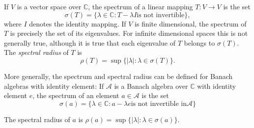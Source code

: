 \documentclass[12pt]{article}
\begin{document}
If $V$ is a vector space over $\mathbb{C}$, the spectrum of a linear mapping $T:V\rightarrow V$ is the set
\[\sigma(T) = 
\{\lambda\in \mathbb{C}: T-\lambda I \mbox{is not invertible}\},\]
where $I$ denotes the identity mapping. 
If $V$ is finite dimensional, the spectrum of $T$ is precisely the set of its eigenvalues. For infinite dimensional spaces this is not generally true,
although it is true that each eigenvalue of $T$ belongs to $\sigma(T)$. The \emph{spectral radius} of $T$ is 
\[\rho(T) = \sup \{|\lambda|:\lambda\in\sigma(T)\}.\]

More generally, the spectrum and spectral radius can be defined for Banach algebras with identity element: If $\mathcal{A}$ is a Banach algebra over $\mathbb{C}$ with identity element $e$, the spectrum of an element $a \in \mathcal{A}$ is the set
 $$\sigma(a) = \{ \lambda \in \mathbb{C} : a - \lambda e \mbox{is not invertible in} \mathcal{A} \}$$

The spectral radius of $a$ is $\rho(a) = \sup \{| \lambda | : \lambda \in \sigma(a) \}$.

\end{document}

